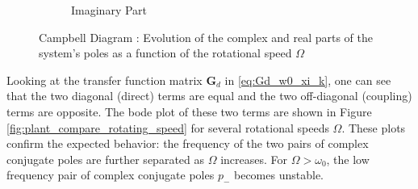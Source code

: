 \documentclass[10pt]{iopart}
\begin{document}
\begin{figure}[htbp]
\begin{subfigure}[c]{0.48\linewidth}
\caption{\label{fig:campbell_diagram_imag} Imaginary Part}
\end{subfigure}
\hfill
\caption{\label{fig:campbell_diagram}Campbell Diagram : Evolution of the complex and real parts of the system's poles as a function of the rotational speed \(\Omega\)}
\centering
\end{figure}

Looking at the transfer function matrix \(\mathbf{G}_d\) in \eqref{eq:Gd_w0_xi_k}, one can see that the two diagonal (direct) terms are equal and the two off-diagonal (coupling) terms are opposite.
The bode plot of these two terms are shown in Figure \ref{fig:plant_compare_rotating_speed} for several rotational speeds \(\Omega\).
These plots confirm the expected behavior: the frequency of the two pairs of complex conjugate poles are further separated as \(\Omega\) increases.
For \(\Omega > \omega_0\), the low frequency pair of complex conjugate poles \(p_{-}\) becomes unstable.
\end{document}

